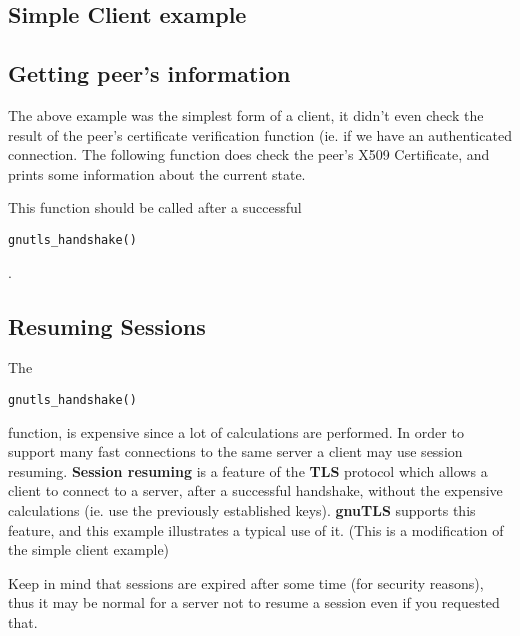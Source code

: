 \documentclass{article}
\begin{document}
\subsection{Simple Client example}


\subsection{Getting peer's information}
\par The above example was the simplest form of a client, it didn't even check
the result of the peer's certificate verification function (ie. if we have
an authenticated connection. The following function does check the peer's X509
Certificate, and prints some information about the current state.
\par
This function should be called after a successful \begin{verbatim}gnutls_handshake()\end{verbatim}.



\subsection{Resuming Sessions}
\par
The \begin{verbatim}gnutls_handshake()\end{verbatim} function, is expensive since
a lot of calculations are performed. In order to support many fast connections to
the same server a client may use session resuming. {\bf Session resuming} is a
feature of the {\bf TLS} protocol which allows a client to connect to a server,
after a successful handshake, without the expensive calculations (ie. use the previously
established keys). {\bf gnuTLS} supports this feature, and this example illustrates a
typical use of it. (This is a modification of the simple client example)

\par
Keep in mind that sessions are expired after some time (for security reasons), thus
it may be normal for a server not to resume a session even if you requested that.





\end{document}
